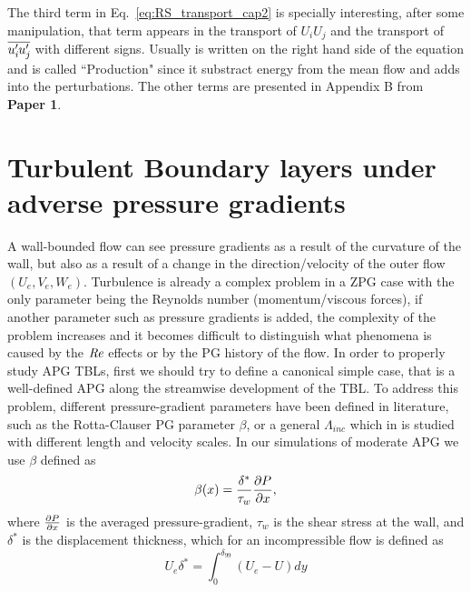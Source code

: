 The third term in Eq.~\ref{eq:RS_transport_cap2} is specially interesting, after some manipulation, that term appears in the transport of $U_iU_j$ and the transport of $\overline{u_i^{\prime}\mkern-1.2mu u_j^{\prime}\mkern-1.2mu}$ with different signs. Usually is written on the right hand side of the equation and is called ``Production" since it substract energy from the mean flow and adds into the perturbations.
The other terms are presented in Appendix B from \textbf{Paper 1}.


\section{Turbulent Boundary layers under adverse pressure gradients}

A wall-bounded flow can see pressure gradients as a result of the curvature of the wall, but also as a result of a change in the direction/velocity of the outer flow $(U_{e}, V_{e}, W_{e})$. Turbulence is already a complex problem in a ZPG case with the only parameter being the Reynolds number (momentum/viscous forces), if another parameter such as pressure gradients is added, the complexity of the problem increases and it becomes difficult to distinguish what phenomena is caused by the $\mbox{\textit{Re}}$ effects or by the PG history of the flow.
In order to properly study APG TBLs, first we should try to define a canonical simple case, that is a well-defined APG along the streamwise development of the TBL.
To address this problem, different pressure-gradient parameters have been defined in literature, such as the Rotta-Clauser PG parameter $\beta$, or a general $\Lambda_{inc}$ which in \cite{Gibis2019} is studied with different length and velocity scales.
In our simulations of moderate APG we use $\beta$ defined as
\begin{equation}
    \beta(x) = \frac{\delta^*}{\tau_w} \pdv{P}{x},
\end{equation}
where $\pdv{P}{x}$ is the averaged pressure-gradient, $\tau_w$ is the shear stress at the wall, and $\delta^*$ is the displacement thickness, which for an incompressible flow is defined as
\begin{equation}
    U_e \delta^* = \int_{0}^{\delta_{99}} (U_e - U) dy
\end{equation}




